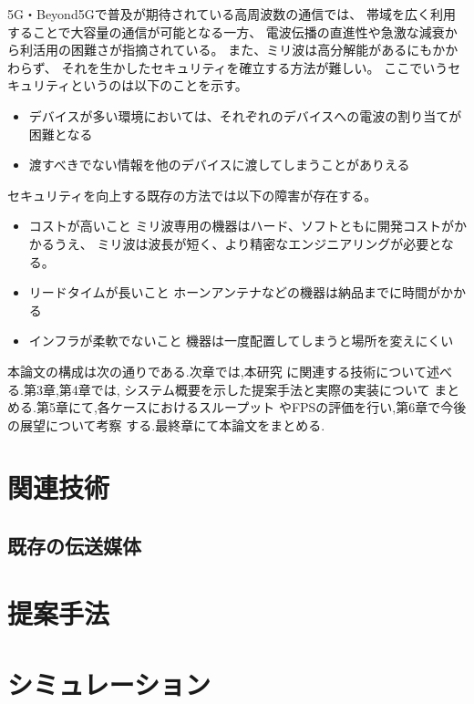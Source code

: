 \documentclass[technicalreport]{ieicej}
\begin{document}
5G・Beyond5Gで普及が期待されている高周波数の通信では、
帯域を広く利用することで大容量の通信が可能となる一方、
電波伝播の直進性や急激な減衰から利活用の困難さが指摘されている。
また、ミリ波は高分解能があるにもかかわらず、
それを生かしたセキュリティを確立する方法が難しい。
ここでいうセキュリティというのは以下のことを示す。

\begin{itemize}
  \item デバイスが多い環境においては、それぞれのデバイスへの電波の割り当てが困難となる
  \item 渡すべきでない情報を他のデバイスに渡してしまうことがありえる
\end{itemize}

セキュリティを向上する既存の方法では以下の障害が存在する。

\begin{itemize}
  \item コストが高いこと
  ミリ波専用の機器はハード、ソフトともに開発コストがかかるうえ、
  ミリ波は波長が短く、より精密なエンジニアリングが必要となる。
  \item リードタイムが長いこと
  ホーンアンテナなどの機器は納品までに時間がかかる
  \item インフラが柔軟でないこと
  機器は一度配置してしまうと場所を変えにくい
\end{itemize}


本論文の構成は次の通りである.次章では,本研究
に関連する技術について述べる.第3章,第4章では,
システム概要を示した提案手法と実際の実装について
まとめる.第5章にて,各ケースにおけるスループット
やFPSの評価を行い,第6章で今後の展望について考察
する.最終章にて本論文をまとめる.

\section{関連技術}

\subsection{既存の伝送媒体}

\section{提案手法}

\section{シミュレーション}
\end{document}
